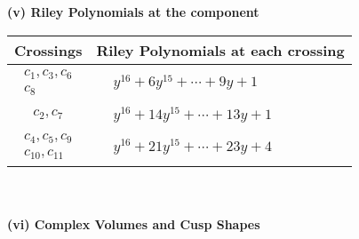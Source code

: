 \documentclass[1p]{elsarticle_modified}
\theoremstyle{definition}
\begin{document}
\newpage\renewcommand{\arraystretch}{1}
\flushleft \textbf{(v) Riley Polynomials at the component}\newline \\
\begin{tabular}{m{50pt}|m{274pt}}
Crossings & \hspace{64pt}Riley Polynomials at each crossing \\
\hline $$\begin{aligned}c_{1},c_{3},c_{6}\\c_{8}\end{aligned}$$&$\begin{aligned}
&y^{16}+6 y^{15}+\cdots+9 y+1
\end{aligned}$\\
\hline $$\begin{aligned}c_{2},c_{7}\end{aligned}$$&$\begin{aligned}
&y^{16}+14 y^{15}+\cdots+13 y+1
\end{aligned}$\\
\hline $$\begin{aligned}c_{4},c_{5},c_{9}\\c_{10},c_{11}\end{aligned}$$&$\begin{aligned}
&y^{16}+21 y^{15}+\cdots+23 y+4
\end{aligned}$\\
\hline
\end{tabular}\\~\\
\newpage\flushleft \textbf{(vi) Complex Volumes and Cusp Shapes}
\end{document}
